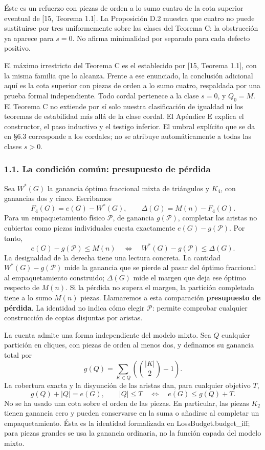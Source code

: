 \documentclass[spanish,11pt,a4paper]{article}
\begin{document}
Éste es un refuerzo con piezas de orden a lo sumo cuatro de la cota superior eventual de {[}15, Teorema 1.1{]}. La Proposición D.2 muestra que cuatro no puede sustituirse por tres uniformemente sobre las clases del Teorema C: la obstrucción ya aparece para \(s=0\). No afirma minimalidad por separado para cada defecto positivo.

El máximo irrestricto del Teorema C es el establecido por {[}15, Teorema 1.1{]}, con la misma familia que lo alcanza. Frente a ese enunciado, la conclusión adicional aquí es la cota superior con piezas de orden a lo sumo cuatro, respaldada por una prueba formal independiente. Todo cordal pertenece a la clase \(s=0\), y \(Q_0=M\). El Teorema C no extiende por sí solo nuestra clasificación de igualdad ni los teoremas de estabilidad más allá de la clase cordal. El Apéndice E explica el constructor, el paso inductivo y el testigo inferior. El umbral explícito que se da en §6.3 corresponde a los cordales; no se atribuye automáticamente a todas las clases \(s>0\).

\subsubsection{1.1. La condición común: presupuesto de pérdida}\label{la-condicion-comun-presupuesto-de-perdida}

Sea \(W^*(G)\) la ganancia óptima fraccional mixta de triángulos y \(K_4\), con ganancias dos y cinco. Escribamos \[
F_4(G)=e(G)-W^*(G),\qquad \Delta(G)=M(n)-F_4(G).
\] Para un empaquetamiento físico \(\mathcal P\), de ganancia \(g(\mathcal P)\), completar las aristas no cubiertas como piezas individuales cuesta exactamente \(e(G)-g(\mathcal P)\). Por tanto, \[
\boxed{
e(G)-g(\mathcal P)\le M(n)
\quad\Longleftrightarrow\quad
W^*(G)-g(\mathcal P)\le\Delta(G).
}
\tag{1.3}
\] La desigualdad de la derecha tiene una lectura concreta. La cantidad \(W^*(G)-g(\mathcal P)\) mide la ganancia que se pierde al pasar del óptimo fraccional al empaquetamiento construido; \(\Delta(G)\) mide el margen que deja ese óptimo respecto de \(M(n)\). Si la pérdida no supera el margen, la partición completada tiene a lo sumo \(M(n)\) piezas. Llamaremos a esta comparación \textbf{presupuesto de pérdida}. La identidad no indica cómo elegir \(\mathcal P\): permite comprobar cualquier construcción de copias disjuntas por aristas.

La cuenta admite una forma independiente del modelo mixto. Sea \(Q\) cualquier partición en cliques, con piezas de orden al menos dos, y definamos su ganancia total por \[
g(Q)=\sum_{K\in Q}\left(\binom{|K|}{2}-1\right).
\] La cobertura exacta y la disyunción de las aristas dan, para cualquier objetivo \(T\), \[
g(Q)+|Q|=e(G),\qquad
|Q|\le T\quad\Longleftrightarrow\quad e(G)\le g(Q)+T.
\tag{1.3a}
\] No se ha usado una cota sobre el orden de las piezas. En particular, las piezas \(K_2\) tienen ganancia cero y pueden conservarse en la suma o añadirse al completar un empaquetamiento. Ésta es la identidad formalizada en {\ttfamily\small LossBudget.\discretionary{\hbox{\ensuremath{\hookrightarrow}}}{}{}budget\_\discretionary{\hbox{\ensuremath{\hookrightarrow}}}{}{}iff}; para piezas grandes se usa la ganancia ordinaria, no la función capada del modelo mixto.
\end{document}
